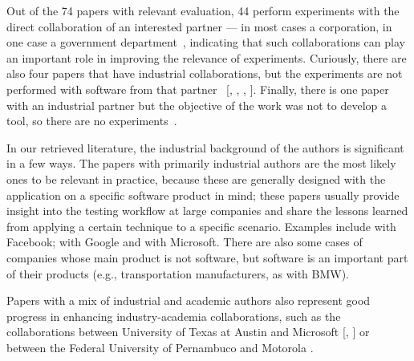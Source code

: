 Out of the 74 papers with relevant evaluation, 44 perform experiments with the direct collaboration of an interested partner --- in most cases a corporation, in one case a government department~, indicating that such collaborations can play an important role in improving the relevance of experiments.
Curiously, there are also four papers that have industrial collaborations, but the experiments are not performed with software from that partner~
[, 
, 
, 
].
Finally, there is one paper with an industrial partner but the objective of the work was not to develop a tool, so there are no experiments~.

In our retrieved literature, the industrial background of the authors is significant in a few ways.
The papers with primarily industrial authors are the most likely ones to be relevant in practice, because these are generally designed with the application on a specific software product in mind; these papers usually provide insight into the testing workflow at large companies and share the lessons learned from applying a certain technique to a specific scenario.
Examples include  with Facebook;  with Google and  with Microsoft. There are also some cases of companies whose main product is not software, but software is an important part of their products (e.g., transportation manufacturers, as  with BMW).

Papers with a mix of industrial and academic authors also represent good progress in enhancing industry-academia collaborations, such as the collaborations between University of Texas at Austin and Microsoft [, ] or between the Federal University of Pernambuco and Motorola .

